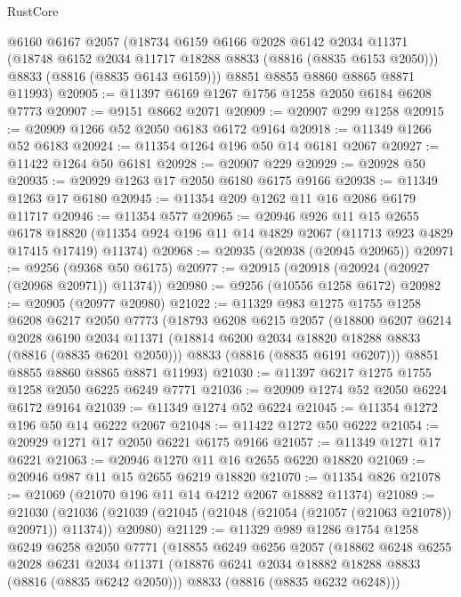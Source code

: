 \begin{lexlean}{RustCore}
\begin{coremodule}
      @6160
      @6167
      @2057
      (@18734
        @6159
        @6166
        @2028
        @6142
        @2034
        @11371
        (@18748 @6152 @2034 @11717 @18288 @8833 (@8816 (@8835 @6153 @2050)))
        @8833
        (@8816 (@8835 @6143 @6159)))
      @8851
      @8855
      @8860
      @8865
      @8871
      @11993)
@20905 := @11397 @6169 @1267 @1756 @1258 @2050 @6184 @6208 @7773
@20907 := @9151 @8662 @2071
@20909 := @20907 @299 @1258
@20915 := @20909 @1266 @52 @2050 @6183 @6172 @9164
@20918 := @11349 @1266 @52 @6183
@20924 := @11354 @1264 @196 @50 @14 @6181 @2067
@20927 := @11422 @1264 @50 @6181
@20928 := @20907 @229
@20929 := @20928 @50
@20935 := @20929 @1263 @17 @2050 @6180 @6175 @9166
@20938 := @11349 @1263 @17 @6180
@20945 := @11354 @209 @1262 @11 @16 @2086 @6179 @11717
@20946 := @11354 @577
@20965 := @20946
    @926
    @11
    @15
    @2655
    @6178
    @18820
    (@11354 @924 @196 @11 @14 @4829 @2067 (@11713 @923 @4829 @17415 @17419) @11374)
@20968 := @20935 (@20938 (@20945 @20965))
@20971 := @9256 (@9368 @50 @6175)
@20977 := @20915 (@20918 (@20924 (@20927 (@20968 @20971)) @11374))
@20980 := @9256 (@10556 @1258 @6172)
@20982 := @20905 (@20977 @20980)
@21022 := @11329
    @983
    @1275
    @1755
    @1258
    @6208
    @6217
    @2050
    @7773
    (@18793
      @6208
      @6215
      @2057
      (@18800
        @6207
        @6214
        @2028
        @6190
        @2034
        @11371
        (@18814 @6200 @2034 @18820 @18288 @8833 (@8816 (@8835 @6201 @2050)))
        @8833
        (@8816 (@8835 @6191 @6207)))
      @8851
      @8855
      @8860
      @8865
      @8871
      @11993)
@21030 := @11397 @6217 @1275 @1755 @1258 @2050 @6225 @6249 @7771
@21036 := @20909 @1274 @52 @2050 @6224 @6172 @9164
@21039 := @11349 @1274 @52 @6224
@21045 := @11354 @1272 @196 @50 @14 @6222 @2067
@21048 := @11422 @1272 @50 @6222
@21054 := @20929 @1271 @17 @2050 @6221 @6175 @9166
@21057 := @11349 @1271 @17 @6221
@21063 := @20946 @1270 @11 @16 @2655 @6220 @18820
@21069 := @20946 @987 @11 @15 @2655 @6219 @18820
@21070 := @11354 @826
@21078 := @21069 (@21070 @196 @11 @14 @4212 @2067 @18882 @11374)
@21089 := @21030
    (@21036 (@21039 (@21045 (@21048 (@21054 (@21057 (@21063 @21078)) @20971)) @11374)) @20980)
@21129 := @11329
    @989
    @1286
    @1754
    @1258
    @6249
    @6258
    @2050
    @7771
    (@18855
      @6249
      @6256
      @2057
      (@18862
        @6248
        @6255
        @2028
        @6231
        @2034
        @11371
        (@18876 @6241 @2034 @18882 @18288 @8833 (@8816 (@8835 @6242 @2050)))
        @8833
        (@8816 (@8835 @6232 @6248)))

\end{coremodule}
\end{lexlean}
